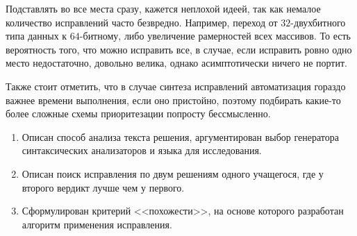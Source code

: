 Подставлять во все места сразу, кажется неплохой идеей, так как немалое количество исправлений часто безвредно.
Например, переход от $32$-двухбитного типа данных к $64$-битному, либо увеличение рамерностей всех массивов.
То есть вероятность того, что можно исправить все, в случае, если исправить ровно одно место недостаточно, довольно велика,
однако асимптотически ничего не портит.

Также стоит отметить, что в случае синтеза исправлений автоматизация гораздо важнее времени выполнения, если оно пристойно, поэтому
подбирать какие-то более сложные схемы приоритезации попросту бессмысленно.

\chapterconclusion

\begin{enumerate}
    \item Описан способ анализа текста решения, аргументирован выбор генератора синтаксических анализаторов и языка для исследования.
    \item Описан поиск исправления по двум решениям одного учащегося, где у второго вердикт лучше чем у первого.
    \item Сформулирован критерий <<похожести>>, на основе которого разработан алгоритм применения исправления.
\end{enumerate}

